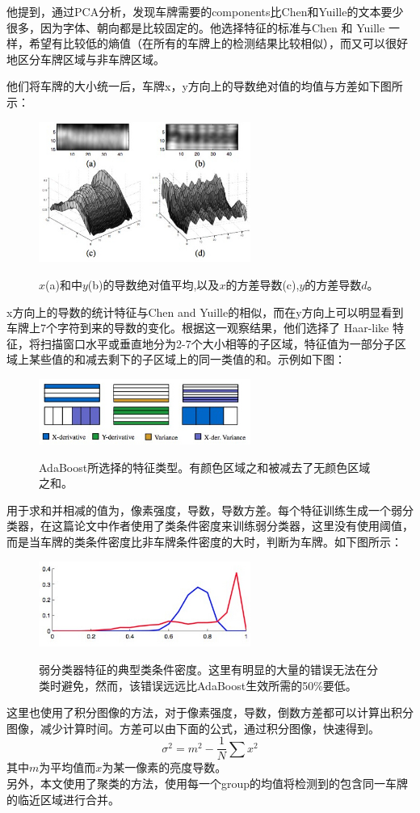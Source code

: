 他提到，通过PCA分析，发现车牌需要的components比Chen和Yuille的文本要少很多，因为字体、朝向都是比较固定的。他选择特征的标准与Chen 和 Yuille 一样，希望有比较低的熵值（在所有的车牌上的检测结果比较相似），而又可以很好地区分车牌区域与非车牌区域。

他们将车牌的大小统一后，车牌x，y方向上的导数绝对值的均值与方差如下图所示：
\begin{figure}[H]
    \centering 
    \includegraphics[width=0.618\textwidth]{image/2_1_3_1.jpg}    
    \label{logic}
    \caption{$x$(a)和中$y$(b)的导数绝对值平均,以及$x$的方差导数(c),$y$的方差导数$d$。}
\end{figure}
x方向上的导数的统计特征与Chen and Yuille的相似，而在y方向上可以明显看到车牌上7个字符到来的导数的变化。根据这一观察结果，他们选择了 Haar-like 特征，将扫描窗口水平或垂直地分为2-7个大小相等的子区域，特征值为一部分子区域上某些值的和减去剩下的子区域上的同一类值的和。示例如下图：
\begin{figure}[H]
    \centering 
    \includegraphics[width=0.618\textwidth]{image/2_1_3_2.jpg}    
    \label{logic}
    \caption{AdaBoost所选择的特征类型。有颜色区域之和被减去了无颜色区域之和。}
\end{figure}
用于求和并相减的值为，像素强度，导数，导数方差。每个特征训练生成一个弱分类器，在这篇论文中作者使用了类条件密度来训练弱分类器，这里没有使用阈值，而是当车牌的类条件密度比非车牌条件密度的大时，判断为车牌。如下图所示：
\begin{figure}[H]
    \centering 
    \includegraphics[width=0.618\textwidth]{image/2_1_3_3.jpg}    
    \label{logic}
    \caption{弱分类器特征的典型类条件密度。这里有明显的大量的错误无法在分类时避免，然而，该错误远远比AdaBoost生效所需的50\%要低。}
\end{figure}
这里也使用了积分图像的方法，对于像素强度，导数，倒数方差都可以计算出积分图像，减少计算时间。方差可以由下面的公式，通过积分图像，快速得到。
$$\sigma^2=m^2-\frac{1}{N}\sum x^2$$
其中$m$为平均值而$x$为某一像素的亮度导数。\\
另外，本文使用了聚类的方法，使用每一个group的均值将检测到的包含同一车牌的临近区域进行合并。

